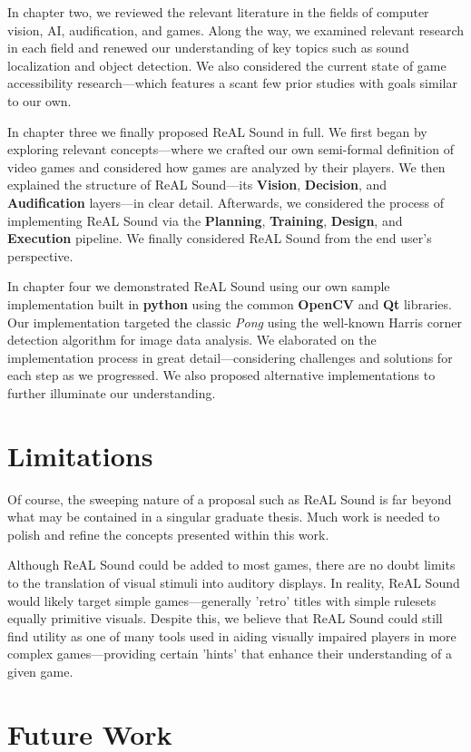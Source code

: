 \documentclass{report}
\newcommand{\rs}{ReAL Sound\xspace}
\newcommand{\plan}{\textbf{Planning}\xspace}
\newcommand{\train}{\textbf{Training}\xspace}
\newcommand{\design}{\textbf{Design}\xspace}
\newcommand{\exec}{\textbf{Execution}\xspace}
\newcommand{\vision}{\textbf{Vision}\xspace}
\newcommand{\decision}{\textbf{Decision}\xspace}
\newcommand{\audio}{\textbf{Audification}\xspace}
\newcommand{\tech}[1]{\textbf{#1}}
\begin{document}
In chapter two, we reviewed the relevant literature in the fields of computer vision, AI, audification, and games. Along the way, we examined relevant research in each field and renewed our understanding of key topics such as sound localization and object detection. We also considered the current state of game accessibility research---which features a scant few prior studies with goals similar to our own.

In chapter three we finally proposed \rs in full. We first began by exploring relevant concepts---where we crafted our own semi-formal definition of video games and considered how games are analyzed by their players. We then explained the structure of \rs---its \vision, \decision, and \audio layers---in clear detail. Afterwards, we considered the process of implementing \rs via the \plan, \train, \design, and \exec pipeline. We finally considered \rs from the end user's perspective.

In chapter four we demonstrated \rs using our own sample implementation built in \tech{python} using the common \tech{OpenCV} and \tech{Qt} libraries. Our implementation targeted the classic \emph{Pong} using the well-known Harris corner detection algorithm for image data analysis. We elaborated on the implementation process in great detail---considering challenges and solutions for each step as we progressed. We also proposed alternative implementations to further illuminate our understanding.

\section{Limitations}
Of course, the sweeping nature of a proposal such as \rs is far beyond what may be contained in a singular graduate thesis. Much work is needed to polish and refine the concepts presented within this work.

Although \rs could be added to most games, there are no doubt limits to the translation of visual stimuli into auditory displays. In reality, \rs would likely target simple games---generally 'retro' titles with simple rulesets equally primitive visuals. Despite this, we believe that \rs could still find utility as one of many tools used in aiding visually impaired players in more complex games---providing certain 'hints' that enhance their understanding of a given game. 

\section{Future Work}
\end{document}
